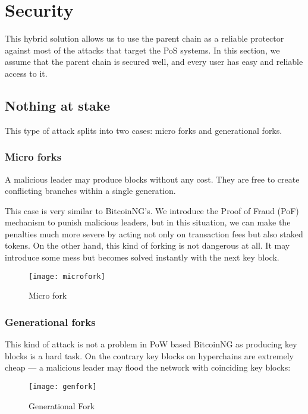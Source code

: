 \section{Security}

This hybrid solution allows us to use the parent chain as a
reliable protector against most of the attacks that target the PoS
systems\cite{pos_attacks}.
In this section, we assume that the parent chain is secured well, and every
user has easy and reliable access to it.

\subsection{Nothing at stake}

This type of attack splits into two cases: micro forks and generational forks.

\subsubsection{Micro forks}

A malicious leader may produce blocks without any cost.
They are free to create conflicting branches within a single generation.

This case is very similar to BitcoinNG's\cite{bcng}. We introduce the Proof of Fraud (PoF)
mechanism to punish malicious leaders, but in this situation, we can make
the penalties much more severe by acting not only on transaction fees
but also staked tokens. On the other hand, this kind of forking is not dangerous
at all. It may introduce some mess but becomes solved instantly with the next key block.

\begin{figure}[h]
	\caption{Micro fork}
	\centering
	\texttt{[image: microfork]}
\end{figure}

\subsubsection{Generational forks}

This kind of attack is not a problem in PoW based BitcoinNG as producing
key blocks is a hard task. On the contrary key blocks on hyperchains are
extremely cheap — a malicious leader may flood the network with coinciding
key blocks:

\begin{figure}[h]
	\caption{Generational Fork}
	\centering
	\texttt{[image: genfork]}
\end{figure}

